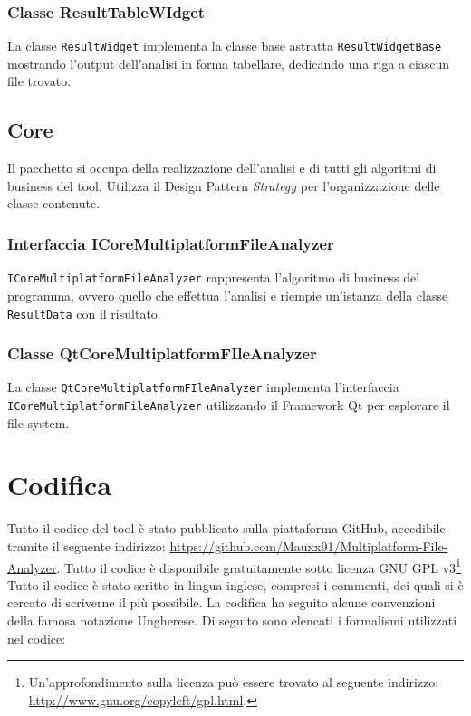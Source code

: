 		\subsubsection{Classe ResultTableWIdget}
			La classe \texttt{ResultWidget} implementa la classe base astratta \texttt{ResultWidgetBase} mostrando l'output dell'analisi in forma tabellare, dedicando una riga a ciascun file trovato.
			
	\subsection{Core}
		Il pacchetto si occupa della realizzazione dell'analisi e di tutti gli algoritmi di business del tool. Utilizza il Design Pattern \textit{Strategy} per l'organizzazione delle classe contenute.
		
		\subsubsection{Interfaccia ICoreMultiplatformFileAnalyzer}
			\texttt{ICoreMultiplatformFileAnalyzer} rappresenta l'algoritmo di business del programma, ovvero quello che effettua l'analisi e riempie un'istanza della classe \texttt{ResultData} con il risultato.
			
		\subsubsection{Classe QtCoreMultiplatformFIleAnalyzer}
			La classe \texttt{QtCoreMultiplatformFIleAnalyzer} implementa l'interfaccia\\ \texttt{ICoreMultiplatformFileAnalyzer} utilizzando il Framework Qt per esplorare il file system.
			
\section{Codifica}
	Tutto il codice del tool è stato pubblicato sulla piattaforma GitHub, accedibile tramite il seguente indirizzo: \url{https://github.com/Mauxx91/Multiplatform-File-Analyzer}. Tutto il codice è disponibile gratuitamente sotto licenza GNU GPL v3\footnote{Un'approfondimento sulla licenza può essere trovato al seguente indirizzo: \url{http://www.gnu.org/copyleft/gpl.html}.}\\

	Tutto il codice è stato scritto in lingua inglese, compresi i commenti, dei quali si è cercato di scriverne il più possibile.
	La codifica ha seguito alcune convenzioni della famosa notazione Ungherese. Di seguito sono elencati i formalismi utilizzati nel codice:
	
